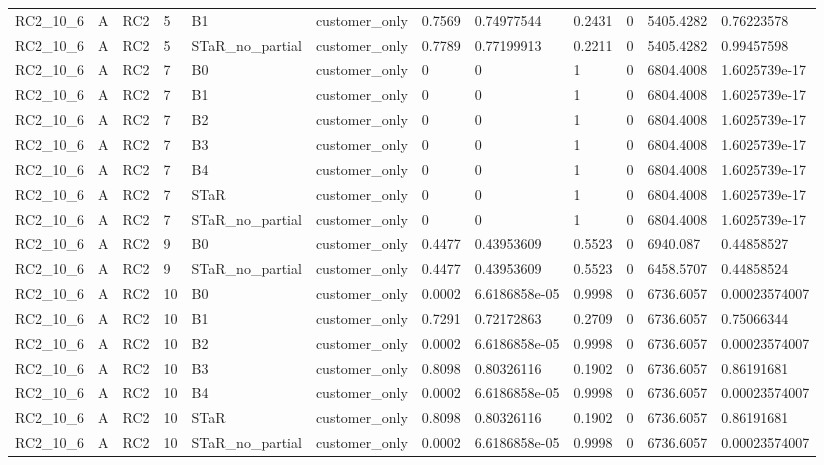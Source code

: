 \begin{longtable}{llllllllllll}
RC2\_10\_6 & A & RC2 & 5 & B1 & customer\_only & 0.7569 & 0.74977544 & 0.2431 & 0 & 5405.4282 & 0.76223578 \\
RC2\_10\_6 & A & RC2 & 5 & STaR\_no\_partial & customer\_only & 0.7789 & 0.77199913 & 0.2211 & 0 & 5405.4282 & 0.99457598 \\
RC2\_10\_6 & A & RC2 & 7 & B0 & customer\_only & 0 & 0 & 1 & 0 & 6804.4008 & 1.6025739e-17 \\
RC2\_10\_6 & A & RC2 & 7 & B1 & customer\_only & 0 & 0 & 1 & 0 & 6804.4008 & 1.6025739e-17 \\
RC2\_10\_6 & A & RC2 & 7 & B2 & customer\_only & 0 & 0 & 1 & 0 & 6804.4008 & 1.6025739e-17 \\
RC2\_10\_6 & A & RC2 & 7 & B3 & customer\_only & 0 & 0 & 1 & 0 & 6804.4008 & 1.6025739e-17 \\
RC2\_10\_6 & A & RC2 & 7 & B4 & customer\_only & 0 & 0 & 1 & 0 & 6804.4008 & 1.6025739e-17 \\
RC2\_10\_6 & A & RC2 & 7 & STaR & customer\_only & 0 & 0 & 1 & 0 & 6804.4008 & 1.6025739e-17 \\
RC2\_10\_6 & A & RC2 & 7 & STaR\_no\_partial & customer\_only & 0 & 0 & 1 & 0 & 6804.4008 & 1.6025739e-17 \\
RC2\_10\_6 & A & RC2 & 9 & B0 & customer\_only & 0.4477 & 0.43953609 & 0.5523 & 0 & 6940.087 & 0.44858527 \\
RC2\_10\_6 & A & RC2 & 9 & STaR\_no\_partial & customer\_only & 0.4477 & 0.43953609 & 0.5523 & 0 & 6458.5707 & 0.44858524 \\
RC2\_10\_6 & A & RC2 & 10 & B0 & customer\_only & 0.0002 & 6.6186858e-05 & 0.9998 & 0 & 6736.6057 & 0.00023574007 \\
RC2\_10\_6 & A & RC2 & 10 & B1 & customer\_only & 0.7291 & 0.72172863 & 0.2709 & 0 & 6736.6057 & 0.75066344 \\
RC2\_10\_6 & A & RC2 & 10 & B2 & customer\_only & 0.0002 & 6.6186858e-05 & 0.9998 & 0 & 6736.6057 & 0.00023574007 \\
RC2\_10\_6 & A & RC2 & 10 & B3 & customer\_only & 0.8098 & 0.80326116 & 0.1902 & 0 & 6736.6057 & 0.86191681 \\
RC2\_10\_6 & A & RC2 & 10 & B4 & customer\_only & 0.0002 & 6.6186858e-05 & 0.9998 & 0 & 6736.6057 & 0.00023574007 \\
RC2\_10\_6 & A & RC2 & 10 & STaR & customer\_only & 0.8098 & 0.80326116 & 0.1902 & 0 & 6736.6057 & 0.86191681 \\
RC2\_10\_6 & A & RC2 & 10 & STaR\_no\_partial & customer\_only & 0.0002 & 6.6186858e-05 & 0.9998 & 0 & 6736.6057 & 0.00023574007 \\

\end{longtable}
